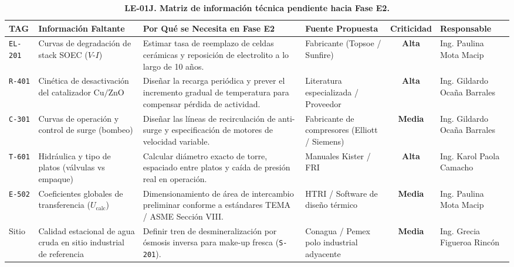 \documentclass[10pt,letterpaper]{article}
\begin{document}
\begin{table}[H]
\centering
\small
\setlength{\tabcolsep}{3.5pt}
\caption{\textbf{LE-01J. Matriz de información técnica pendiente hacia Fase E2.}} \label{tab:cuadro13}
\begin{tabularx}{\textwidth}{l >{\raggedright\arraybackslash}p{2.9cm} >{\raggedright\arraybackslash}X >{\raggedright\arraybackslash}p{2.3cm} c >{\raggedright\arraybackslash}p{2.8cm}}
\toprule
\textbf{TAG} & \textbf{Información Faltante} & \textbf{Por Qué se Necesita en Fase E2} & \textbf{Fuente Propuesta} & \textbf{Criticidad} & \textbf{Responsable} \\
\midrule
\texttt{EL-201} & Curvas de degradación de stack SOEC ($V\text{-}I$) & Estimar tasa de reemplazo de celdas cerámicas y reposición de electrolito a lo largo de 10 años. & Fabricante (Topsoe / Sunfire) & \textbf{Alta} & Ing. Paulina Mota Macip \\
\texttt{R-401} & Cinética de desactivación del catalizador $\text{Cu/ZnO}$ & Diseñar la recarga periódica y prever el incremento gradual de temperatura para compensar pérdida de actividad. & Literatura especializada / Proveedor & \textbf{Alta} & Ing. Gildardo Ocaña Barrales \\
\texttt{C-301} & Curvas de operación y control de surge (bombeo) & Diseñar las líneas de recirculación de anti-surge y especificación de motores de velocidad variable. & Fabricante de compresores (Elliott / Siemens) & \textbf{Media} & Ing. Gildardo Ocaña Barrales \\
\texttt{T-601} & Hidráulica y tipo de platos (válvulas vs empaque) & Calcular diámetro exacto de torre, espaciado entre platos y caída de presión real en operación. & Manuales Kister / FRI & \textbf{Alta} & Ing. Karol Paola Camacho \\
\texttt{E-502} & Coeficientes globales de transferencia ($U_{\text{calc}}$) & Dimensionamiento de área de intercambio preliminar conforme a estándares TEMA / ASME Sección VIII. & HTRI / Software de diseño térmico & \textbf{Media} & Ing. Paulina Mota Macip \\
Sitio & Calidad estacional de agua cruda en sitio industrial de referencia & Definir tren de desmineralización por ósmosis inversa para make-up fresca (\texttt{S-201}). & Conagua / Pemex polo industrial adyacente & \textbf{Media} & Ing. Grecia Figueroa Rincón \\
\bottomrule
\end{tabularx}
\end{table}

\newpage
\end{document}
